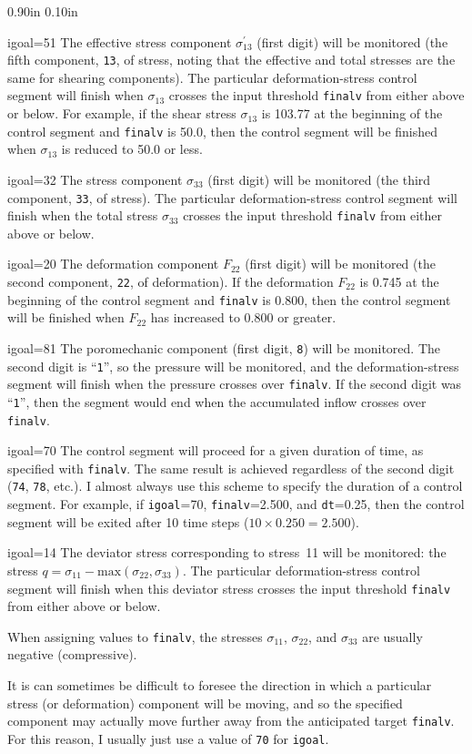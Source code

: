 \documentclass[letterpaper,11pt]{article}
\newlength{\Labelwidth}
\newcommand{\Entrylabel}[1]{\makebox[\Labelwidth][r]{\texttt{#1}}}
\newenvironment{Options}
{\begin{list}{}{%
\renewcommand{\makelabel}{\Entrylabel}%
\setlength{\leftmargin} {0.90in}%
\setlength{\rightmargin}{0.00in}%
\setlength{\labelsep}   {0.10in}%
\setlength{\labelwidth} {\Labelwidth}%
}}
{\end{list}}
\begin{document}
\begin{Options}
\item[igoal=51]
The effective
stress component $\sigma^{\prime}_{13}$ (first digit) will be monitored
(the fifth component, \texttt{13}, of stress,
noting that the effective and total stresses are the same
for shearing components).
The particular deformation-stress control segment will finish
when $\sigma_{13}$ crosses the input
threshold \texttt{finalv} from either above or
below.  For example, if the shear stress $\sigma_{13}$ is 103.77
at the beginning of the control segment and \texttt{finalv} is
50.0, then the control segment will be finished when $\sigma_{13}$
is reduced to 50.0 or less.
%
\item[igoal=32]
The stress component $\sigma_{33}$ (first digit) will be monitored
(the third component, \texttt{33}, of stress).
The particular deformation-stress control segment will finish
when the total stress $\sigma_{33}$ crosses the input
threshold \texttt{finalv} from either above or
below.
%
\item[igoal=20]
The deformation component $F_{22}$ (first digit) will be monitored
(the second component, \texttt{22}, of deformation).
If the deformation $F_{22}$ is 0.745 at the beginning of
the control segment and \texttt{finalv} is 0.800,
then the control segment will be finished when  $F_{22}$ has increased
to 0.800 or greater.
%
\item[igoal=81]
The poromechanic component (first digit, \texttt{8})
will be monitored.
The second digit is ``\texttt{1}'', so the pressure
will be monitored, and the deformation-stress segment
will finish when the pressure crosses over \texttt{finalv}.
If the second digit was ``\texttt{1}'', then
the segment would end when the accumulated inflow crosses
over \texttt{finalv}.
%
\item[igoal=70]
The control segment will proceed for a given duration of time,
as specified with \texttt{finalv}.
The same result is achieved regardless of the second digit (\texttt{74},
\texttt{78}, etc.).
I almost always use this scheme to specify the duration of a control segment.
For example, if \texttt{igoal}=70, \texttt{finalv}=2.500, and 
\texttt{dt}=0.25, then the control segment will be exited after 10 time
steps ($10 \times 0.250 = 2.500$).
\item[igoal=14]
The deviator stress corresponding to stress~11 will be monitored:
the stress $q=\sigma_{11} - \text{max}(\sigma_{22},\sigma_{33})$.
The particular deformation-stress control segment will finish
when this deviator stress crosses the input
threshold \texttt{finalv} from either above or
below.
\end{Options}
When assigning values to \texttt{finalv}, the stresses $\sigma_{11}$,
$\sigma_{22}$, and $\sigma_{33}$ are usually negative (compressive).
\par
It is can sometimes be difficult to foresee the direction in which
a particular stress (or deformation) component will be moving,
and so the specified component may actually move further 
away from the anticipated target \texttt{finalv}.
For this reason, I usually just use a value of \texttt{70}
for \texttt{igoal}.
%
\end{document}
